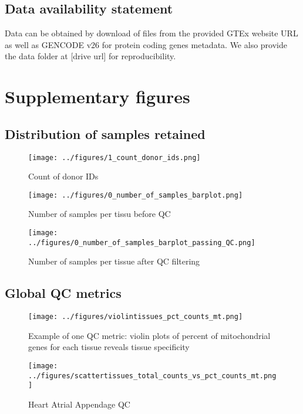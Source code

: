 \documentclass{article}
\begin{document}
\subsection{Data availability statement}
Data can be obtained by download of files from the provided GTEx website URL as well as GENCODE v26 for protein coding genes metadata. We also provide the data folder at [drive url] for reproducibility.

\section{Supplementary figures}

\subsection{Distribution of samples retained}
\begin{figure}[htbp]
  \centering
  \texttt{[image: ../figures/1\_count\_donor\_ids.png]}
  \caption{Count of donor IDs}
  \label{fig:1_count_donor_ids}
\end{figure}


\begin{figure}[htbp]
  \centering
  \texttt{[image: ../figures/0\_number\_of\_samples\_barplot.png]}
  \caption{Number of samples per tissu before QC}
  \label{fig:0_number_of_samples_barplot}
\end{figure}

\begin{figure}[htbp]
  \centering
  \texttt{[image: ../figures/0\_number\_of\_samples\_barplot\_passing\_QC.png]}
  \caption{Number of samples per tissue after QC filtering}
  \label{fig:0_number_of_samples_barplot_passing_QC}
\end{figure}


\FloatBarrier
\subsection{Global QC metrics}
\begin{figure}[htbp]
  \centering
  \texttt{[image: ../figures/violintissues\_pct\_counts\_mt.png]}
  \caption{Example of one QC metric: violin plots of percent of mitochondrial genes for each tissue reveals tissue specificity}
  \label{fig:violintissues_pct_counts_mt}
\end{figure}

\begin{figure}[htbp]
  \centering
  \texttt{[image: ../figures/scattertissues\_total\_counts\_vs\_pct\_counts\_mt.png]}
  \caption{Heart Atrial Appendage QC}
  \label{fig:scattertissues_total_counts_vs_pct_counts_mt}
\end{figure}
\end{document}
